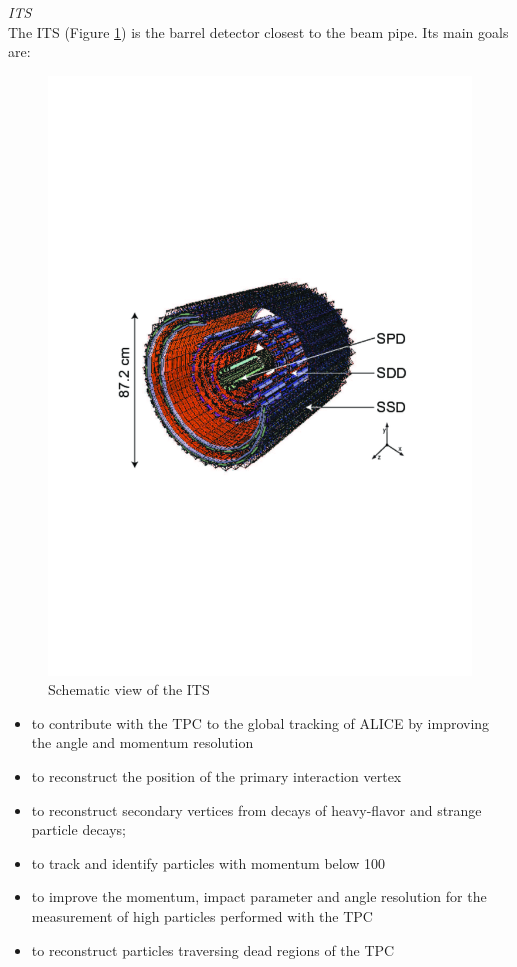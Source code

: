 {\Large\textsl{ITS}}\\
The ITS \cite{cite:ALICE} (Figure \ref{fig:its}) is the barrel detector closest to the beam pipe. Its main goals are:
\begin{figure}[htbp]
\begin{center}
\includegraphics[width=12.cm]{./Version1/FigChapter4/FigureITS}
\caption{Schematic view of the ITS \cite{cite:ITS}}
\label{fig:its}
\end{center}
\end{figure}

\begin{itemize}
\item to contribute with the TPC to the global tracking of ALICE by improving the angle and momentum resolution
\item to reconstruct the position of the primary interaction vertex
\item to reconstruct secondary vertices from decays of heavy-flavor and strange particle decays;
\item to track and identify particles with momentum below 100 \mmass
\item to improve the momentum, impact parameter and angle resolution for the measurement of high \pt particles performed with the TPC
\item to reconstruct particles traversing dead regions of the TPC
\end{itemize}



